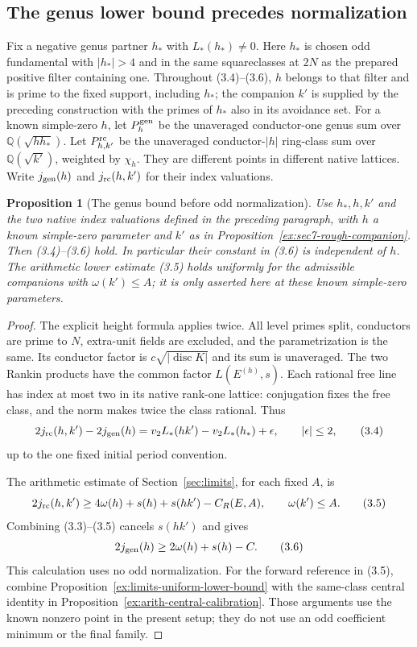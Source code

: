 \documentclass[11pt]{article}
\newtheorem{proposition}[theorem]{Proposition}
\theoremstyle{definition}
\theoremstyle{remark}
\newcommand{\Q}{\mathbb Q}
\begin{document}
\subsection{The genus lower bound precedes normalization}
Fix a negative genus partner $h_*$ with $L_*(h_*)\ne0$.
Here $h_*$ is chosen odd fundamental with $|h_*|>4$ and in the
same squareclasses at $2N$ as the prepared positive filter containing
one. Throughout (3.4)--(3.6), $h$ belongs to that filter and is
prime to the fixed support, including $h_*$; the companion $k'$
is supplied by the preceding construction with the primes of $h_*$
also in its avoidance set.
For a known simple-zero $h$, let $P_h^{\rm gen}$ be the unaveraged
conductor-one genus sum over $\Q(\sqrt{hh_*})$.
Let $P_{h,k'}^{\rm rc}$ be the unaveraged conductor-$|h|$ ring-class
sum over $\Q(\sqrt{k'})$, weighted by $\chi_h$.
They are different points in different native lattices.
Write $j_{\rm gen}(h)$ and $j_{\rm rc}(h,k')$ for their index valuations.

\begin{proposition}[The genus bound before odd normalization]\label{ex:sec7-genus-lower}
Use $h_*,h,k'$ and the two native index valuations defined in the
preceding paragraph, with $h$ a known simple-zero parameter and $k'$
as in Proposition~\ref{ex:sec7-rough-companion}. Then (3.4)--(3.6)
hold. In particular their constant in (3.6) is independent of $h$.
The arithmetic lower estimate (3.5) holds uniformly for the admissible
companions with $\omega(k')\le A$; it is only asserted here at these
known simple-zero parameters.
\end{proposition}
\begin{proof}\leavevmode
The explicit height formula \cite[Theorem 1.1]{cst} applies twice.
All level primes split, conductors are prime to $N$, extra-unit fields
are excluded, and the parametrization is the same. Its conductor factor
is $c\sqrt{|\operatorname{disc}K|}$ and its sum is unaveraged.
The two Rankin products have the common factor $L(E^{(h)},s)$.
Each rational free line has index at most two in its native rank-one
lattice: conjugation fixes the free class, and the norm makes twice the
class rational. Thus
\[
 2j_{\rm rc}(h,k')-2j_{\rm gen}(h)
   =v_2L_*(hk')-v_2L_*(h_*)+\epsilon,\qquad |\epsilon|\le2,        \tag{3.4}
\]
up to the one fixed initial period convention.

The arithmetic estimate of Section~\ref{sec:limits}, for each fixed $A$,
is
\[
 2j_{\rm rc}(h,k')\ge
 4\omega(h)+s(h)+s(hk')-C_R(E,A),\qquad \omega(k')\le A.           \tag{3.5}
\]
Combining (3.3)--(3.5) cancels $s(hk')$ and gives
\[
 2j_{\rm gen}(h)\ge 2\omega(h)+s(h)-C.                            \tag{3.6}
\]
This calculation uses no odd normalization.
For the forward reference in (3.5), combine
Proposition~\ref{ex:limits-uniform-lower-bound} with the same-class
central identity in Proposition~\ref{ex:arith-central-calibration}.
Those arguments use the known nonzero point in the present setup;
they do not use an odd coefficient minimum or the final family.
\end{proof}
\end{document}
